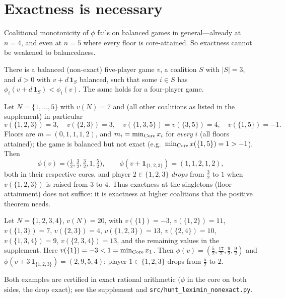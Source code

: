 \section{Exactness is necessary}\label{sec:lx-necessity}

Coalitional monotonicity of $\phi$ fails on balanced games in general---already at
$n=4$, and even at $n=5$ where every floor is core-attained. So exactness cannot be
weakened to balancedness.

\begin{theorem}\label{thm:lx-necessity}
There is a balanced (non-exact) five-player game $v$, a coalition $S$ with $|S|=3$,
and $d>0$ with $v+d\,\mathbf 1_S$ balanced, such that some $i\in S$ has
$\phi_i(v+d\,\mathbf 1_S)<\phi_i(v)$. The same holds for a four-player game.
\end{theorem}

\begin{example}[$n=5$; floors attained]\label{ex:lx-n5}
Let $N=\{1,\dots,5\}$ with $v(N)=7$ and (all other coalitions as listed in the
supplement) in particular
\[
  v(\{1,2,3\})=3,\quad v(\{2,3\})=3,\quad v(\{1,3,5\})=v(\{3,5\})=4,\quad
  v(\{1,5\})=-1 .
\]
Floors are $m=(0,1,1,1,2)$, and $m_i=\min_{\operatorname{Core}}x_i$ for \emph{every} $i$ (all
floors attained); the game is balanced but not exact (e.g.\
$\min_{\operatorname{Core}}x(\{1,5\})=1>-1$). Then
\[
  \phi(v)=\bigl(\tfrac12,\tfrac32,\tfrac32,1,\tfrac52\bigr),\qquad
  \phi(v+\mathbf 1_{\{1,2,3\}})=(1,1,2,1,2),
\]
both in their respective cores, and player $2\in\{1,2,3\}$ \emph{drops} from
$\tfrac32$ to $1$ when $v(\{1,2,3\})$ is raised from $3$ to $4$. Thus exactness at
the singletons (floor attainment) does not suffice: it is exactness at higher
coalitions that the positive theorem needs.
\end{example}

\begin{example}[$n=4$; floor unattained]\label{ex:lx-n4}
Let $N=\{1,2,3,4\}$, $v(N)=20$, with $v(\{1\})=-3$, $v(\{1,2\})=11$,
$v(\{1,3\})=7$, $v(\{2,3\})=4$, $v(\{1,2,3\})=13$, $v(\{2,4\})=10$,
$v(\{1,3,4\})=9$, $v(\{2,3,4\})=13$, and the remaining values in the supplement.
Here $v(\{1\})=-3<1=\min_{\operatorname{Core}}x_1$. Then $\phi(v)=(\tfrac52,\tfrac{17}2,
\tfrac92,\tfrac92)$ and $\phi(v+3\,\mathbf 1_{\{1,2,3\}})=(2,9,5,4)$: player
$1\in\{1,2,3\}$ drops from $\tfrac52$ to $2$.
\end{example}

Both examples are certified in exact rational arithmetic ($\phi$ in the core on
both sides, the drop exact); see the supplement and \texttt{src/hunt\_leximin\_nonexact.py}.



